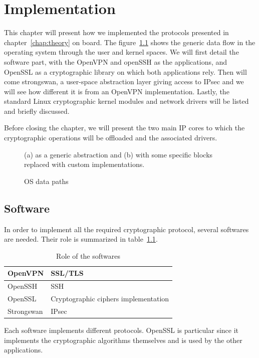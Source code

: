 \chapter{Implementation}
This chapter will present how we implemented the protocols presented in chapter~\ref{chap:theory} on board.
The figure~\ref{fig:os-path-generic} shows the generic data flow in the operating system through the user and kernel spaces.
We will first detail the software part, with the OpenVPN and openSSH as the applications, and OpenSSL as a cryptographic library on which both applications rely.
Then will come strongswan, a user-space abstraction layer giving access to IPsec and we will see how different it is from an OpenVPN implementation.
Lastly, the standard Linux cryptographic kernel modules and network drivers will be listed and briefly discussed.

Before closing the chapter, we will present the two main IP cores to which the cryptographic operations will be offloaded and the associated drivers.


\begin{figure}[ht]
\center
{}
\caption{OS data paths}{(a) as a generic abstraction and (b) with some specific blocks replaced with custom implementations.}
\label{fig:os-path-generic}
\end{figure}

\section{Software}
In order to implement all the required cryptographic protocol, several softwares are needed.
Their role is summarized in table~\ref{tab:soft-role}.

\begin{table}[ht]
\center
\begin{tabular}{|l|l|} \hline
OpenVPN & SSL/TLS \\ \hline
OpenSSH & SSH \\ \hline
OpenSSL & Cryptographic ciphers implementation \\ \hline
Strongswan & IPsec \\ \hline
\end{tabular}
\caption{Role of the softwares}{Each software implements different protocols. OpenSSL is particular since it implements the cryptographic algorithms themselves and is used by the other applications.}
\label{tab:soft-role}
\end{table}

